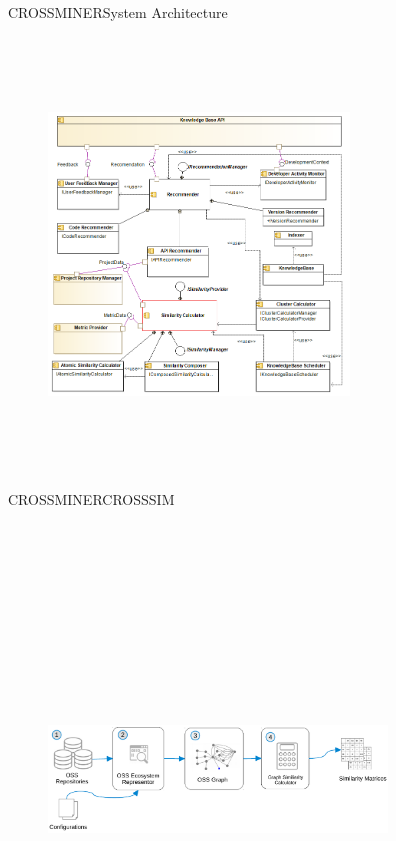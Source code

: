 \documentclass{beamer}
\begin{document}
\begin{frame}{CROSSMINER}{System Architecture}
	\begin{figure}[!h]
	\includegraphics[width=8cm,height=11.5cm,keepaspectratio]{images/component.png}
	\centering
	\label{fig:ComponentDiagram}
	\end{figure}
\end{frame}

\begin{frame}{CROSSMINER}{CROSSSIM}
	\begin{figure}[!h]
	\includegraphics[width=9cm,height=13.5cm,keepaspectratio]{images/CrossSim.pdf}
	\centering
	\label{fig:CrossSim}
	\end{figure}
\end{frame}
\end{document}
